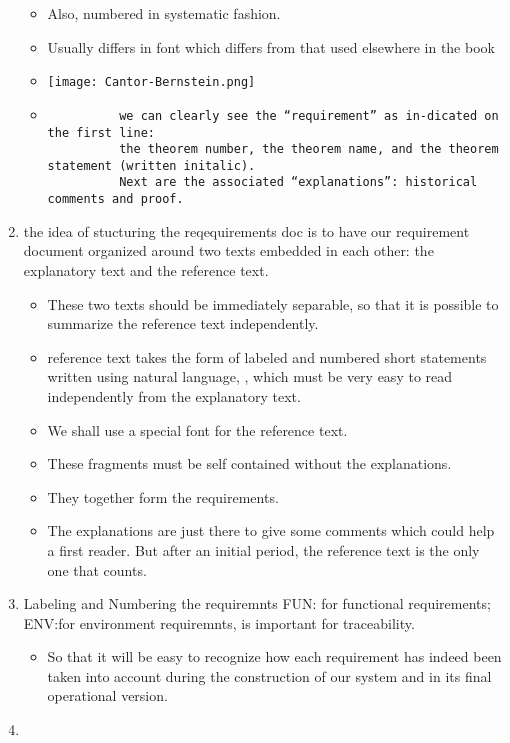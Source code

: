 \documentclass{article}
\begin{document}
\begin{enumerate}
\begin{itemize}
        \item Also, numbered in systematic fashion.
        \item Usually differs in font which differs from that used elsewhere in the book
        \item \texttt{[image: Cantor-Bernstein.png]}
        \item \begin{verbatim}
          we can clearly see the “requirement” as in-dicated on the first line: 
          the theorem number, the theorem name, and the theorem statement (written initalic). 
          Next are the associated “explanations”: historical comments and proof.
        \end{verbatim}
      \end{itemize}
      \item the idea of stucturing the reqequirements doc is to have our requirement document organized around two texts embedded in each other: the explanatory text and the reference text.\begin{itemize}
        \item These two texts should be immediately separable, so that it is possible to summarize the reference text independently.
        \item reference text takes the form of labeled and numbered short statements written using natural language, , which must be very easy to read independently from the explanatory text.
        \item We shall use a special font for the reference text. 
        \item These fragments must be self contained without the explanations. 
        \item They together form the requirements. 
        \item The explanations are just there to give some comments which could help a first reader. But after an initial period, the reference text is the only one that counts.
      \end{itemize}
      \item Labeling and Numbering the requiremnts FUN: for functional requirements; ENV:for environment requiremnts, is important for traceability.\begin{itemize}
        \item So that it will be easy to recognize how each requirement has indeed been taken into account during the construction of our system and in its final operational version.
      \end{itemize}
      \item 
  \end{enumerate}
\end{document}

